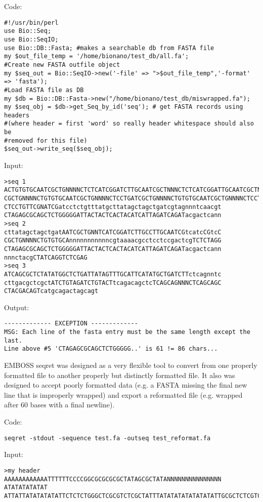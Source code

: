 Code:
\begin{verbatim}
#!/usr/bin/perl
use Bio::Seq;
use Bio::SeqIO;
use Bio::DB::Fasta; #makes a searchable db from FASTA file
my $out_file_temp = '/home/bionano/test_db/all.fa';
#Create new FASTA outfile object
my $seq_out = Bio::SeqIO->new('-file' => ">$out_file_temp",'-format' => 'fasta');
#Load FASTA file as DB
my $db = Bio::DB::Fasta->new("/home/bionano/test_db/miswrapped.fa");
my $seq_obj = $db->get_Seq_by_id('seq'); # get FASTA records using headers 
#(where header = first 'word' so really header whitespace should also be 
#removed for this file)
$seq_out->write_seq($seq_obj);
\end{verbatim}

Input: 
\begin{verbatim}
>seq 1
ACTGTGTGCAATCGCTGNNNNCTCTCATCGGATCTTGCAATCGCTNNNCTCTCATCGGATTGCAATCGCTNNNCTtcatcCGGAT
CGCTGNNNNCTGTGTGCAATCGCTGNNNNCTCCTGATCGCTGNNNNCTGTGTGCAATCGCTGNNNNCTCCTGCAATCGCTGNNNN
CTCCTGTTCGNATCGatcctctgtttatgcttatagctagctgatcgtagnnntcaacgt
CTAGAGCGCAGCTCTGGGGGATTACTACTCACTACATCATTAGATCAGATacgactcann
>seq 2
cttatagctagctgatAATCGCTGNNTCATCGGATCTTGCCTTGCAATCGtcatcCGtcC
CGCTGNNNNCTGTGTGCAnnnnnnnnnnncgtaaaacgcctcctccgactcgTCTCTAGG
CTAGAGCGCAGCTCTGGGGGATTACTACTCACTACATCATTAGATCAGATacgactcann
nnnctacgCTATCAGGTCTCGAG
>seq 3
ATCAGCGCTCTATATGGCTCTGATTATAGTTTGCATTCATATGCTGATCTTctcagnntc
cttgacgctcgctATCTGTAGATCTGTACTtcagacagctcTCAGCAGNNNCTCAGCAGC
CTACGACAGTcatgcagactagcagt
\end{verbatim}

Output:
\begin{verbatim}
------------- EXCEPTION -------------
MSG: Each line of the fasta entry must be the same length except the last. 
Line above #5 'CTAGAGCGCAGCTCTGGGGG..' is 61 != 86 chars...
\end{verbatim}

EMBOSS seqret was designed as a very flexible tool to convert from one properly formatted file to another properly but distinctly formatted file. It also was designed to accept poorly formatted data (e.g. a FASTA missing the final new line that is improperly wrapped) and export a reformatted file (e.g. wrapped after 60 bases with a final newline).

Code:

\begin{verbatim}
seqret -stdout -sequence test.fa -outseq test_reformat.fa
\end{verbatim}

Input:

\begin{verbatim}
>my header
AAAAAAAAAAAATTTTTTCCCCGGCGCGCGCGCTATAGCGCTATANNNNNNNNNNNNNNN
ATATATATATAT
ATTATTATATATATATTCTCTCTGGGCTCGCGTCTCGCTATTTATATATATATATATATTGCGCTCTCGTCTCCT\end{verbatim}

